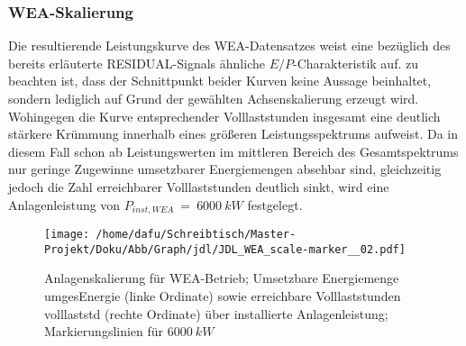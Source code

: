 \documentclass[onecolumn,10pt,titlepage]{article}
\begin{document}
\subsubsection{WEA-Skalierung}
Die resultierende Leistungskurve des WEA-Datensatzes weist eine bezüglich des bereits erläuterte RESIDUAL-Signals ähnliche $E/P$-Charakteristik auf.
zu beachten ist, dass der Schnittpunkt beider Kurven keine Aussage beinhaltet, sondern lediglich auf Grund der gewählten Achsenskalierung erzeugt wird.
 Wohingegen die Kurve entsprechender Volllaststunden insgesamt eine deutlich stärkere Krümmung innerhalb eines größeren Leistungsspektrums aufweist. Da in diesem Fall schon ab Leistungswerten im mittleren Bereich des Gesamtspektrums nur geringe Zugewinne umsetzbarer Energiemengen absehbar sind, gleichzeitig jedoch die Zahl erreichbarer Volllaststunden deutlich sinkt, wird eine Anlagenleistung von $P_{inst,WEA} ~=~6000~kW$ festgelegt.
\begin{figure}[H]
	
	\centering
	\texttt{[image: /home/dafu/Schreibtisch/Master-Projekt/Doku/Abb/Graph/jdl/JDL\_WEA\_scale-marker\_\_02.pdf]}

	\caption[Anlagenskalierung für WEA-Betrieb]{Anlagenskalierung für WEA-Betrieb; Umsetzbare Energiemenge \gls{umgesEnergie} (linke Ordinate) sowie erreichbare Volllaststunden \gls{volllaststd} (rechte Ordinate) über installierte Anlagenleistung; Markierungslinien für $6000~kW$}
	\label{fig:Skal_WEA} 
\end{figure}
\end{document}
